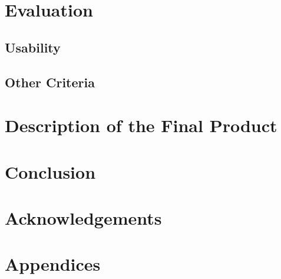 \documentclass[twocolumn]{article}
\begin{document}
\section{Evaluation}
\vspace{-1ex}

\subsection{Usability}

\subsection{Other Criteria}

\section{Description of the Final Product}
\vspace{-1ex}

\section{Conclusion}
\vspace{-1ex}

\section*{Acknowledgements}
\vspace{-1ex}


\begin{thebibliography}{9}
\end{thebibliography}

\section*{Appendices}
\vspace{-1ex}
\end{document}
